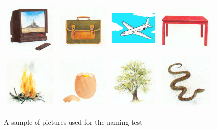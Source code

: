 \documentclass[output=paper,newtxmath,modfonts,nonflat,draftmode]{langsci/langscibook}
\begin{document}
\begin{figure}
\caption{A sample of pictures used for the naming test}

\begin{tabularx}{\textwidth}{XXXX}
\includegraphics[width=.2\textwidth]{figures/takam-img1.png} & 
\includegraphics[width=.2\textwidth]{figures/takam-img2.png} & 
\includegraphics[width=.2\textwidth]{figures/takam-img3.png} & 
\includegraphics[width=.2\textwidth]{figures/takam-img4.png} \\
                       
\includegraphics[width=.2\textwidth]{figures/takam-img5.png} & 
\includegraphics[width=.2\textwidth]{figures/takam-img6.png} & 
\includegraphics[width=.2\textwidth]{figures/takam-img7.png} & 
\includegraphics[width=.2\textwidth]{figures/takam-img8.png} \\
                       

\end{tabularx}
\end{figure}
\end{document}
